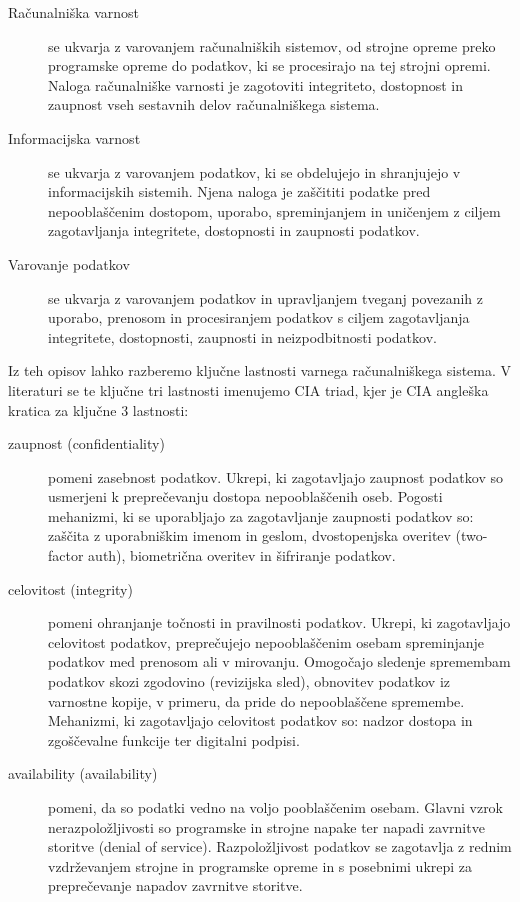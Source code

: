 \documentclass[12pt,a4paper,openany,tikz]{book}
\theoremstyle{plain}
\theoremstyle{definition}
\begin{document}
\begin{description}
	\item[Računalniška varnost] se ukvarja z varovanjem računalniških sistemov, od strojne opreme preko programske opreme do podatkov, ki se procesirajo na tej strojni opremi. Naloga računalniške varnosti je zagotoviti integriteto, dostopnost in zaupnost vseh sestavnih delov računalniškega sistema.

  \item[Informacijska varnost] se ukvarja z varovanjem podatkov, ki se obdelujejo in shranjujejo v informacijskih sistemih. Njena naloga je zaščititi podatke pred nepooblaščenim dostopom, uporabo, spreminjanjem in uničenjem z ciljem zagotavljanja integritete, dostopnosti in zaupnosti podatkov.

  \item[Varovanje podatkov] se ukvarja z varovanjem podatkov in upravljanjem tveganj povezanih z uporabo, prenosom in procesiranjem podatkov s ciljem zagotavljanja integritete, dostopnosti, zaupnosti in neizpodbitnosti podatkov.
\end{description}

Iz teh opisov lahko razberemo ključne lastnosti varnega računalniškega sistema. V literaturi se te ključne tri lastnosti imenujemo CIA triad, kjer je CIA angleška kratica za ključne 3 lastnosti:



\begin{description}
\item[\Gls{zaupnost} (confidentiality)] pomeni zasebnost podatkov. Ukrepi, ki zagotavljajo zaupnost podatkov so usmerjeni k preprečevanju dostopa nepooblaščenih oseb. Pogosti mehanizmi, ki se uporabljajo za zagotavljanje zaupnosti podatkov so: zaščita z uporabniškim imenom in geslom, dvostopenjska overitev (two-factor auth), biometrična overitev in šifriranje podatkov.

\item[\Gls{celovitost} (integrity)] pomeni ohranjanje točnosti in pravilnosti podatkov. Ukrepi, ki zagotavljajo celovitost podatkov, preprečujejo nepooblaščenim osebam spreminjanje podatkov med prenosom ali v mirovanju. Omogočajo sledenje spremembam podatkov skozi zgodovino (revizijska sled), obnovitev podatkov iz varnostne kopije, v primeru, da pride do nepooblaščene spremembe. Mehanizmi, ki zagotavljajo celovitost podatkov so: nadzor dostopa in zgoščevalne funkcije ter digitalni podpisi.

\item[\Gls{availability} (availability)] pomeni, da so podatki vedno na voljo pooblaščenim osebam. Glavni vzrok nerazpoložljivosti so programske in strojne napake ter napadi zavrnitve storitve (denial of service). Razpoložljivost podatkov se zagotavlja z rednim vzdrževanjem strojne in programske opreme in s posebnimi ukrepi za preprečevanje napadov zavrnitve storitve.

\end{description}
\end{document}
